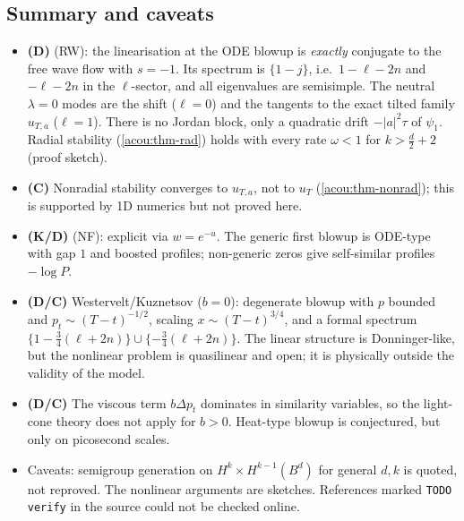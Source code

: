 \subsection{Summary and caveats}
\label{acou:sub-summary}
\begin{itemize}[nosep]
\item \textbf{(D)} (RW): the linearisation at the ODE blowup is
  \emph{exactly} conjugate to the free wave flow with $s=-1$. Its spectrum
  is $\{1-j\}$, i.e.\ $1-\ell-2n$ and $-\ell-2n$ in the $\ell$-sector, and
  all eigenvalues are semisimple. The neutral $\lambda=0$ modes are the shift
  ($\ell=0$) and the tangents to the exact tilted family $u_{T,a}$
  ($\ell=1$). There is no Jordan block, only a quadratic drift $-|a|^2\tau$
  of $\psi_1$. Radial stability (\cref{acou:thm-rad}) holds with every rate
  $\omega<1$ for $k>\frac d2+2$ (proof sketch).
\item \textbf{(C)} Nonradial stability converges to $u_{T,a}$, not to $u_T$
  (\cref{acou:thm-nonrad}); this is supported by 1D numerics but not proved
  here.
\item \textbf{(K/D)} (NF): explicit via $w=e^{-u}$. The generic first
  blowup is ODE-type with gap $1$ and boosted profiles; non-generic zeros
  give self-similar profiles $-\log P$.
\item \textbf{(D/C)} Westervelt/Kuznetsov ($b=0$): degenerate blowup with
  $p$ bounded and $p_t\sim(T-t)^{-1/2}$, scaling $x\sim(T-t)^{3/4}$, and a
  formal spectrum $\{1-\frac34(\ell+2n)\}\cup\{-\frac34(\ell+2n)\}$. The
  linear structure is Donninger-like, but the nonlinear problem is
  quasilinear and open; it is physically outside the validity of the model.
\item \textbf{(D/C)} The viscous term $b\Delta p_t$ dominates in similarity
  variables, so the light-cone theory does not apply for $b>0$. Heat-type
  blowup is conjectured, but only on picosecond scales.
\item Caveats: semigroup generation on $H^k\times H^{k-1}(B^d)$ for general $d,k$ is
  quoted, not reproved. The nonlinear arguments are sketches. References
  marked \texttt{TODO verify} in the source could not be checked online.
\end{itemize}
